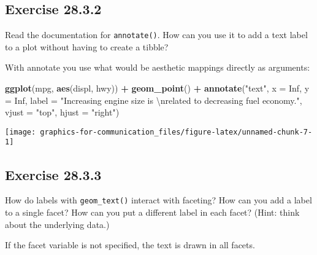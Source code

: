 \documentclass[]{book}
\newenvironment{Shaded}{\begin{snugshade}}{\end{snugshade}}
\newcommand{\CharTok}[1]{\textcolor[rgb]{0.31,0.60,0.02}{#1}}
\newcommand{\DataTypeTok}[1]{\textcolor[rgb]{0.13,0.29,0.53}{#1}}
\newcommand{\KeywordTok}[1]{\textcolor[rgb]{0.13,0.29,0.53}{\textbf{#1}}}
\newcommand{\NormalTok}[1]{#1}
\newcommand{\OperatorTok}[1]{\textcolor[rgb]{0.81,0.36,0.00}{\textbf{#1}}}
\newcommand{\OtherTok}[1]{\textcolor[rgb]{0.56,0.35,0.01}{#1}}
\newcommand{\StringTok}[1]{\textcolor[rgb]{0.31,0.60,0.02}{#1}}
\theoremstyle{plain}
\theoremstyle{remark}
\theoremstyle{definition}
\theoremstyle{definition}
\theoremstyle{definition}
\theoremstyle{remark}
\begin{document}
\hypertarget{exercise-28.3.2}{%
\subsection*{\texorpdfstring{Exercise
{28.3.2}}{Exercise 28.3.2}}\label{exercise-28.3.2}}

Read the documentation for \texttt{annotate()}. How can you use it to
add a text label to a plot without having to create a tibble?

With annotate you use what would be aesthetic mappings directly as
arguments:

\begin{Shaded}
\begin{Highlighting}[]
\KeywordTok{ggplot}\NormalTok{(mpg, }\KeywordTok{aes}\NormalTok{(displ, hwy)) }\OperatorTok{+}
\StringTok{  }\KeywordTok{geom_point}\NormalTok{() }\OperatorTok{+}
\StringTok{  }\KeywordTok{annotate}\NormalTok{(}\StringTok{"text"}\NormalTok{, }\DataTypeTok{x =} \OtherTok{Inf}\NormalTok{, }\DataTypeTok{y =} \OtherTok{Inf}\NormalTok{,}
           \DataTypeTok{label =} \StringTok{"Increasing engine size is }\CharTok{\textbackslash{}n}\StringTok{related to decreasing fuel economy."}\NormalTok{, }\DataTypeTok{vjust =} \StringTok{"top"}\NormalTok{, }\DataTypeTok{hjust =} \StringTok{"right"}\NormalTok{)}
\end{Highlighting}
\end{Shaded}

\begin{center}\texttt{[image: graphics-for-communication\_files/figure-latex/unnamed-chunk-7-1]} \end{center}

\hypertarget{exercise-28.3.3}{%
\subsection*{\texorpdfstring{Exercise
{28.3.3}}{Exercise 28.3.3}}\label{exercise-28.3.3}}

How do labels with \texttt{geom\_text()} interact with faceting? How can
you add a label to a single facet? How can you put a different label in
each facet? (Hint: think about the underlying data.)

If the facet variable is not specified, the text is drawn in all facets.
\end{document}
